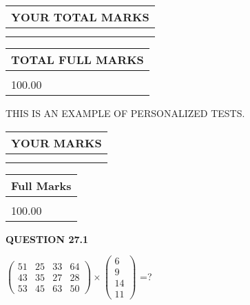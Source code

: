 \documentclass[12pt]{article}
\begin{document}
   
\vspace{0.2in}\noindent\begin{tabular}{|l|}
\hline
YOUR TOTAL MARKS  \\
\hline
 \\ 
 \\ 
\hline
\end{tabular}
\hspace{0.05in} \begin{tabular}{|l|}
\hline
TOTAL FULL MARKS  \\
\hline
 \\ 
100.00 \\
\hline
\end{tabular}
   
   
 \vspace{0.2in}
{\Huge  THIS IS AN EXAMPLE OF}
{\Huge  PERSONALIZED TESTS. }
   
   
  
\vspace{0.2in}
  
\noindent\begin{tabular}{|l|}
\hline
 YOUR MARKS  \\
\hline
 \\ 
 \\ 
\hline
\end{tabular}
\hspace{0.05in} \begin{tabular}{|l|}
\hline
 Full Marks  \\
\hline
 \\ 
100.00 \\
\hline
\end{tabular}
{\textbf{\Large{QUESTION
27.1 
}}}
  
  
 
$ \left( \begin{array}{ccccccccc}
 51  & 
 25  & 
 33  & 
 64  \\ 
 43  & 
 35  & 
 27  & 
 28  \\ 
 53  & 
 45  & 
 63  & 
 50
\end{array}\right) \times
\left( \begin{array}{c}
 6  \\ 
 9  \\ 
 14  \\ 
 11
\end{array}\right) $ =?
 
\end{document}
